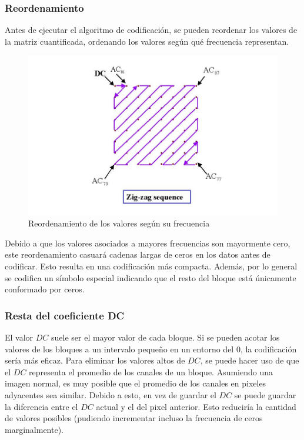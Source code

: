 \documentclass[%
	final,
	reprint,
	notitlepage,
	narroweqnarray,
	inline,
	twoside,
	invited
	]{ieee}
\begin{document}
\subsubsection{Reordenamiento}

\par Antes de ejecutar el algoritmo de codificación, se pueden reordenar los valores de la matriz cuantificada, 
ordenando los valores según qué frecuencia representan. 

\begin{figure}
	\includegraphics[scale=0.5]{./img/zig-zag.jpg}
	\caption{Reordenamiento de los valores según su frecuencia}
\end{figure}

\par Debido a que los valores asociados a mayores frecuencias son mayormente cero, este reordenamiento casuará 
cadenas largas de ceros en los datos antes de codificar. Esto resulta en una codificación más compacta. Además, 
por lo general se codifica un símbolo especial indicando que el resto del bloque está únicamente conformado 
por ceros.

\subsubsection{Resta del coeficiente DC}

El valor $DC$ suele ser el mayor valor de cada bloque. Si se pueden acotar los valores de los bloques a un intervalo 
pequeño en un entorno del 0, la codificación sería más eficaz. Para eliminar los valores altos de $DC$, se puede hacer 
uso de que el $DC$ representa el promedio de los canales de un bloque. Asumiendo una imagen normal, es muy posible 
que el promedio de los canales en pixeles adyacentes sea similar. Debido a esto, en vez de guardar el $DC$ se puede 
guardar la diferencia entre el $DC$ actual y el del pixel anterior. Esto reduciría la cantidad de valores 
posibles (pudiendo incrementar incluso la frecuencia de ceros marginalmente).
\end{document}
